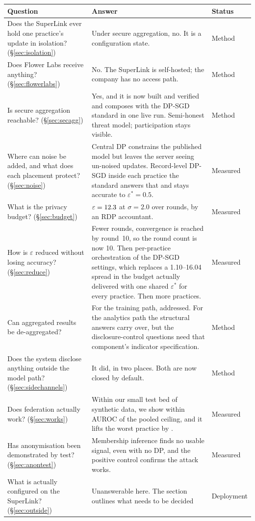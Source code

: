 \begin{longtable}{p{}p{}p{}}
\toprule
\textbf{Question} & \textbf{Answer} & \textbf{Status} \\
\midrule
\endhead
Does the SuperLink ever hold one practice's update in isolation? (\S\ref{sec:isolation})
  & Under secure aggregation, no. It is a configuration state.
  & Method \\
\addlinespace
Does Flower Labs receive anything? (\S\ref{sec:flowerlabs})
  & No. The SuperLink is self-hosted; the company has no access path.
  & Method \\
\addlinespace
Is secure aggregation reachable? (\S\ref{sec:secagg})
  & Yes, and it is now built and verified and composes with the DP-SGD standard in one live
    run. Semi-honest threat model; participation stays visible.
  & Method \\
\addlinespace
Where can noise be added, and what does each placement protect? (\S\ref{sec:noise})
  & Central DP constrains the published model but leaves the server seeing un-noised updates.
    Record-level DP-SGD inside each practice the standard answers that and stays
    accurate to $\varepsilon^{*} = 0.5$.
  & Measured \\
\addlinespace
What is the privacy budget? (\S\ref{sec:budget})
  & $\varepsilon = 12.3$ at $\sigma = 2.0$ over \DPRounds{} rounds, by an RDP accountant.
  & Measured \\
\addlinespace
How is $\varepsilon$ reduced without losing accuracy? (\S\ref{sec:reduce})
  & Fewer rounds, convergence is reached by round~10, so the round count is now 10. Then
    per-practice orchestration of the DP-SGD settings, which replaces a 1.10--16.04 spread in the
    budget actually delivered with one shared $\varepsilon^{*}$ for every practice. Then more
    practices.
  & Measured \\
\addlinespace
Can aggregated results be de-aggregated?
  & For the training path, addressed. For the analytics path the structural answers carry over, but
    the disclosure-control questions need that component's indicator specification.
  & Method \\
\addlinespace
Does the system disclose anything outside the model path? (\S\ref{sec:sidechannels})
  & It did, in two places. Both are now closed by default.
  & Method \\
\addlinespace
Does federation actually work? (\S\ref{sec:works})
  & Within our small test bed of synthetic data, we show within \CeilingGapAbs{} AUROC of the
    pooled ceiling, and it lifts the worst practice by \WorstGain{}.
  & Measured \\
\addlinespace
Has anonymisation been demonstrated by test? (\S\ref{sec:anontest})
  & Membership inference finds no usable signal, even with no DP, and the positive control
    confirms the attack works.
  & Measured \\
\addlinespace
What is actually configured on the SuperLink? (\S\ref{sec:outside})
  & Unanswerable here. The section outlines what needs to be decided
  & Deployment \\
\bottomrule
\end{longtable}


